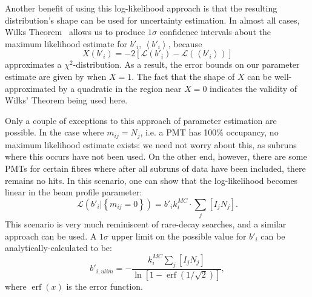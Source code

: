 Another benefit of using this log-likelihood approach is that the resulting distribution's shape can be used for uncertainty estimation. In almost all cases, Wilks Theorem~\cite{wilks_large-sample_1938} allows us to produce $1 \sigma$ confidence intervals about the maximum likelihood estimate for $b'_{i}$, $\left<b'_{i}\right>$, because $$X(b'_{i}) = -2\left[\mathcal{L}\left(b'_{i}\right) - \mathcal{L}\left(\left<b'_{i}\right>\right)\right]$$ approximates a $\chi^2$-distribution. As a result, the error bounds on our parameter estimate are given by when $X = 1$. The fact that the shape of $X$ can be well-approximated by a quadratic in the region near $X = 0$ indicates the validity of Wilks' Theorem being used here.

Only a couple of exceptions to this approach of parameter estimation are possible. In the case where $m_{ij} = N_{j}$, i.e. a PMT has 100\% occupancy, no maximum likelihood estimate exists: we need not worry about this, as subruns where this occurs have not been used. On the other end, however, there are some PMTs for certain fibres where after all subruns of data have been included, there remains no hits. In this scenario, one can show that the log-likelihood becomes linear in the beam profile parameter:
\begin{equation}
    \mathcal{L}\left(b'_{i}|\left\{m_{ij}=0\right\}\right) = b'_{i}k_{i}^{MC}\cdot\sum_{j}\left[I_{j}N_{j}\right].
\end{equation}
This scenario is very much reminiscent of rare-decay searches, and a similar approach can be used. A $1 \sigma$ upper limit on the possible value for $b'_{i}$ can be analytically-calculated to be:
\begin{equation}
    b'_{i,ulim} = -\frac{k_{i}^{MC}\sum_{j}\left[I_{j}N_{j}\right]}{\ln\left[1 - \operatorname{erf}\left(1/\sqrt{2}\right)\right]},
\end{equation}
where $\operatorname{erf}(x)$ is the error function.

